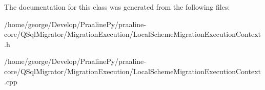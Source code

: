 The documentation for this class was generated from the following files\+:\begin{DoxyCompactItemize}
\item 
/home/george/\+Develop/\+Praaline\+Py/praaline-\/core/\+Q\+Sql\+Migrator/\+Migration\+Execution/Local\+Scheme\+Migration\+Execution\+Context.\+h\item 
/home/george/\+Develop/\+Praaline\+Py/praaline-\/core/\+Q\+Sql\+Migrator/\+Migration\+Execution/Local\+Scheme\+Migration\+Execution\+Context.\+cpp\end{DoxyCompactItemize}
